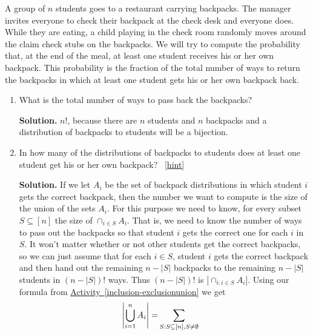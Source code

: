 \documentclass{book}
\begin{document}
\setcounter{project}{222}
\addtocounter{project}{-1}
\begin{activity}[]\label{hatcheck}
\hypertarget{p-1235}{}%
A group of \(n\) students goes to a restaurant carrying backpacks. The manager invites everyone to check their backpack at the check desk and everyone does. While they are eating, a child playing in the check room randomly moves around the claim check stubs on the backpacks. We will try to compute the probability that, at the end of the meal, at least one student receives his or her own backpack.  This probability is the fraction of the total number of ways to return the backpacks in which at least one student gets his or her own backpack back.%
\begin{enumerate}[font=\bfseries,label=(\alph*),ref=\alph*]
\item\label{task-228} \hypertarget{p-1236}{}%
What is the total number of ways to pass back the backpacks?%
\par\smallskip%
\noindent\textbf{Solution.}\hypertarget{solution-145}{}\quad%
\hypertarget{p-1237}{}%
\(n!\), because there are \(n\) students and \(n\) backpacks and a distribution of backpacks to students will be a bijection.%
\item\label{task-229} \hypertarget{p-1238}{}%
In how many of the distributions of backpacks to students does at least one student get his or her own backpack?%
~\hfill{\tiny\hyperlink{a-222.b}{[hint]}\hypertarget{q-222.b}{}}\par\smallskip%
\noindent\textbf{Solution.}\hypertarget{solution-146}{}\quad%
\hypertarget{p-1241}{}%
If we let \(A_i\) be the set of backpack distributions in which student \(i\) gets the correct backpack, then the number we want to compute is the size of the union of the sets \(A_i\). For this purpose we need to know, for every subset \(S\subseteq [n]\) the size of \(\cap_{i\in S}A_i\). That is, we need to know the number of ways to pass out the backpacks so that student \(i\) gets the correct one for each \(i\) in \(S\). It won't matter whether or not other students get the correct backpacks, so we can just assume that for each \(i\in S\), student \(i\) gets the correct backpack and then hand out the remaining \(n-|S|\) backpacks to the remaining \(n-|S|\) students in \((n-|S|)!\) ways. Thus \((n-|S|)!\) is \(|\cap_{i:i\in S}A_i|\). Using our formula from \hyperref[inclusion-exclusionunion]{Activity~\ref{inclusion-exclusionunion}} we get%
\begin{align*}
\left|\bigcup_{i=1}^n A_i \right|  =\amp  \sum_{S:
S\subseteq [n], S\not=\emptyset}

\end{align*}
\end{enumerate}
\end{activity}
\end{document}
